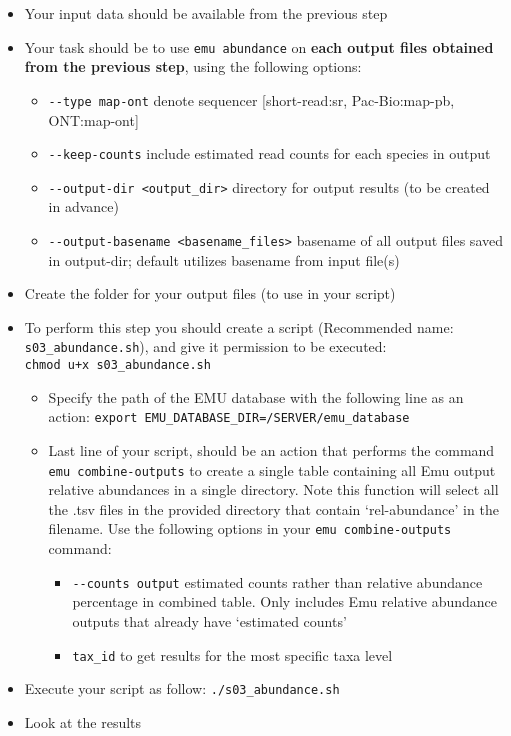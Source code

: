 \documentclass[
]{book}
\providecommand{\tightlist}{%
  \setlength{\itemsep}{0pt}\setlength{\parskip}{0pt}}
\begin{document}
\begin{itemize}
\tightlist
\item
  Your input data should be available from the previous step
\item
  Your task should be to use \texttt{emu\ abundance} on \textbf{each output files obtained from the previous step}, using the following options:

  \begin{itemize}
  \tightlist
  \item
    \texttt{-\/-type\ map-ont} denote sequencer {[}short-read:sr, Pac-Bio:map-pb, ONT:map-ont{]}
  \item
    \texttt{-\/-keep-counts} include estimated read counts for each species in output
  \item
    \texttt{-\/-output-dir\ \textless{}output\_dir\textgreater{}} directory for output results (to be created in advance)
  \item
    \texttt{-\/-output-basename\ \textless{}basename\_files\textgreater{}} basename of all output files saved in output-dir; default utilizes basename from input file(s)
  \end{itemize}
\item
  Create the folder for your output files (to use in your script)
\item
  To perform this step you should create a script (Recommended name: \texttt{s03\_abundance.sh}), and give it permission to be executed: \texttt{chmod\ u+x\ s03\_abundance.sh}

  \begin{itemize}
  \tightlist
  \item
    Specify the path of the EMU database with the following line as an action: \texttt{export\ EMU\_DATABASE\_DIR=/SERVER/emu\_database}
  \item
    Last line of your script, should be an action that performs the command \texttt{emu\ combine-outputs} to create a single table containing all Emu output relative abundances in a single directory. Note this function will select all the .tsv files in the provided directory that contain `rel-abundance' in the filename. Use the following options in your \texttt{emu\ combine-outputs} command:

    \begin{itemize}
    \tightlist
    \item
      \texttt{-\/-counts\ output} estimated counts rather than relative abundance percentage in combined table. Only includes Emu relative abundance outputs that already have `estimated counts'
    \item
      \texttt{tax\_id} to get results for the most specific taxa level
    \end{itemize}
  \end{itemize}
\item
  Execute your script as follow: \texttt{./s03\_abundance.sh}
\item
  Look at the results
\end{itemize}
\end{document}
